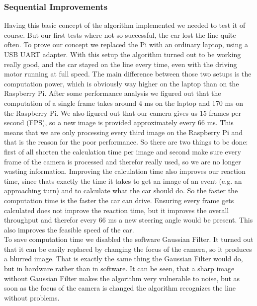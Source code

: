 \documentclass[11pt,twocolumn]{article}
\begin{document}

\subsubsection{Sequential Improvements}
Having this basic concept of the algorithm implemented we needed to test it of course. But our first tests where not so successful, the car lost the line quite often. To prove our concept we replaced the Pi with an ordinary laptop, using a USB UART adapter. With this setup the algorithm turned out to be working really good, and the car stayed on the line every time, even with the driving motor running at full speed. The main difference between those two setups is the computation power, which is obviously way higher on the laptop than on the Raspberry Pi. After some performance analysis we figured out that the computation of a single frame takes around 4 ms on the laptop and 170 ms on the Raspberry Pi.
We also figured out that our camera gives us 15 frames per second (FPS), so a new image is provided approximately every 66 ms. This means that we are only processing every third image on the Raspberry Pi and that is the reason for the poor performance. So there are two things to be done: first of all shorten the calculation time per image and second make sure every frame of the camera is processed and therefor really used, so we are no longer wasting information. Improving the calculation time also improves our reaction time, since thats exactly the time it takes to get an image of an event (e.g. an approaching turn) and to calculate what the car should do. So the faster the computation time is the faster the car can drive. Ensuring every frame gets calculated does not improve the reaction time, but it improves the overall throughput and therefor every 66 ms a new steering angle would be present. This also improves the feasible speed of the car.\\
To save computation time we disabled the software Gaussian Filter. It turned out that it can be easily replaced by changing the focus of the camera, so it produces a blurred image. That is exactly the same thing the Gaussian Filter would do, but in hardware rather than in software. It can be seen, that a sharp image without Gaussian Filter makes the algorithm very vulnerable to noise, but as soon as the focus of the camera is changed the algorithm recognizes the line without problems. \\
\end{document}
